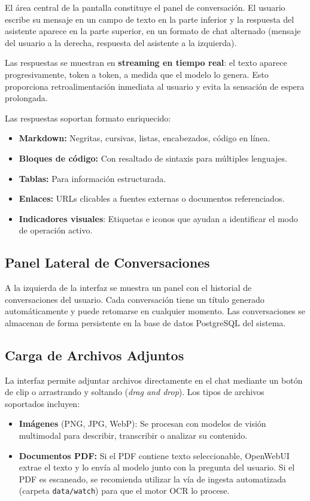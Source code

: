 El área central de la pantalla constituye el panel de conversación. El usuario escribe su mensaje en un campo de texto en la parte inferior y la respuesta del asistente aparece en la parte superior, en un formato de chat alternado (mensaje del usuario a la derecha, respuesta del asistente a la izquierda).

Las respuestas se muestran en \textbf{streaming en tiempo real}: el texto aparece progresivamente, token a token, a medida que el modelo lo genera. Esto proporciona retroalimentación inmediata al usuario y evita la sensación de espera prolongada.

Las respuestas soportan formato enriquecido:
\begin{itemize}
    \item \textbf{Markdown:} Negritas, cursivas, listas, encabezados, código en línea.
    \item \textbf{Bloques de código:} Con resaltado de sintaxis para múltiples lenguajes.
    \item \textbf{Tablas:} Para información estructurada.
    \item \textbf{Enlaces:} URLs clicables a fuentes externas o documentos referenciados.
    \item \textbf{Indicadores visuales}: Etiquetas e iconos que ayudan a identificar el modo de operación activo.
\end{itemize}

\subsection{Panel Lateral de Conversaciones}

A la izquierda de la interfaz se muestra un panel con el historial de conversaciones del usuario. Cada conversación tiene un título generado automáticamente y puede retomarse en cualquier momento. Las conversaciones se almacenan de forma persistente en la base de datos PostgreSQL del sistema.

\subsection{Carga de Archivos Adjuntos}

La interfaz permite adjuntar archivos directamente en el chat mediante un botón de clip o arrastrando y soltando (\textit{drag and drop}). Los tipos de archivos soportados incluyen:

\begin{itemize}
    \item \textbf{Imágenes} (PNG, JPG, WebP): Se procesan con modelos de visión multimodal para describir, transcribir o analizar su contenido.
    \item \textbf{Documentos PDF:} Si el PDF contiene texto seleccionable, OpenWebUI extrae el texto y lo envía al modelo junto con la pregunta del usuario. Si el PDF es escaneado, se recomienda utilizar la vía de ingesta automatizada (carpeta \texttt{data/watch}) para que el motor OCR lo procese.
\end{itemize}

